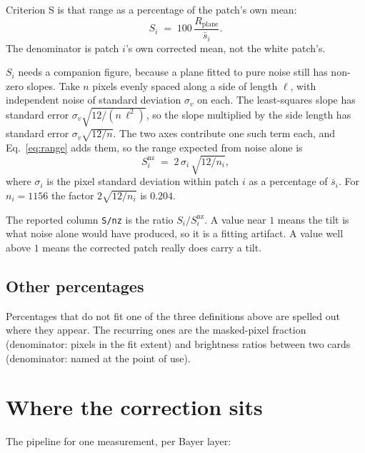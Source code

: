 \documentclass[11pt, a4paper]{article}
\newcommand{\code}[1]{\texttt{#1}}
\begin{document}
Criterion S is that range as a percentage of the patch's own mean:
\begin{equation}
  S_i \;=\; 100\,\frac{R_{\mathrm{plane}}}{\bar{s}_i} .
  \label{eq:critS}
\end{equation}
The denominator is patch $i$'s own corrected mean, not the white patch's.

$S_i$ needs a companion figure,
because a plane fitted to pure noise still has non-zero slopes.
Take $n$ pixels evenly spaced along a side of length $\ell$,
with independent noise of standard deviation $\sigma_v$ on each.
The least-squares slope has standard error
$\sigma_v \sqrt{12 / (n\,\ell^{2})}$,
so the slope multiplied by the side length has standard error
$\sigma_v \sqrt{12/n}$.
The two axes contribute one such term each, and Eq.~\ref{eq:range} adds them,
so the range expected from noise alone is
\begin{equation}
  S^{\mathrm{nz}}_i \;=\; 2\,\sigma_i\,\sqrt{12/n_i} ,
  \label{eq:snz}
\end{equation}
where $\sigma_i$ is the pixel standard deviation within patch $i$
as a percentage of $\bar{s}_i$.
For $n_i = 1156$ the factor $2\sqrt{12/n_i}$ is $0.204$.

The reported column \code{S/nz} is the ratio $S_i / S^{\mathrm{nz}}_i$.
A value near $1$ means the tilt is what noise alone would have produced,
so it is a fitting artifact.
A value well above $1$ means the corrected patch really does carry a tilt.

\subsection{Other percentages}

Percentages that do not fit one of the three definitions above
are spelled out where they appear.
The recurring ones are the masked-pixel fraction
(denominator: pixels in the fit extent)
and brightness ratios between two cards
(denominator: named at the point of use).

\section{Where the correction sits}
\label{sec:pipeline}

The pipeline for one measurement, per Bayer layer:
\end{document}
